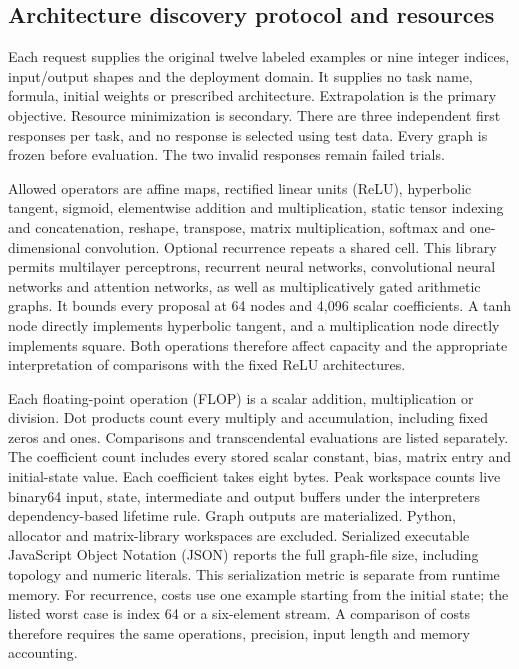 \subsection{Architecture discovery protocol and resources}\label{app:architecture_search}

Each request supplies the original twelve labeled examples or nine integer indices, input/output shapes and the deployment domain. It supplies no task name, formula, initial weights or prescribed architecture. Extrapolation is the primary objective. Resource minimization is secondary. There are three independent first responses per task, and no response is selected using test data. Every graph is frozen before evaluation. The two invalid responses remain failed trials.

Allowed operators are affine maps, rectified linear units (ReLU), hyperbolic tangent, sigmoid, elementwise addition and multiplication, static tensor indexing and concatenation, reshape, transpose, matrix multiplication, softmax and one-dimensional convolution. Optional recurrence repeats a shared cell. This library permits multilayer perceptrons, recurrent neural networks, convolutional neural networks and attention networks, as well as multiplicatively gated arithmetic graphs. It bounds every proposal at 64 nodes and 4,096 scalar coefficients. A tanh node directly implements hyperbolic tangent, and a multiplication node directly implements square. Both operations therefore affect capacity and the appropriate interpretation of comparisons with the fixed ReLU architectures.

Each floating-point operation (FLOP) is a scalar addition, multiplication or division. Dot products count every multiply and accumulation, including fixed zeros and ones. Comparisons and transcendental evaluations are listed separately. The coefficient count includes every stored scalar constant, bias, matrix entry and initial-state value. Each coefficient takes eight bytes. Peak workspace counts live binary64 input, state, intermediate and output buffers under the interpreter\textquotesingle s dependency-based lifetime rule. Graph outputs are materialized. Python, allocator and matrix-library workspaces are excluded. Serialized executable JavaScript Object Notation (JSON) reports the full graph-file size, including topology and numeric literals. This serialization metric is separate from runtime memory. For recurrence, costs use one example starting from the initial state; the listed worst case is index 64 or a six-element stream. A comparison of costs therefore requires the same operations, precision, input length and memory accounting.


